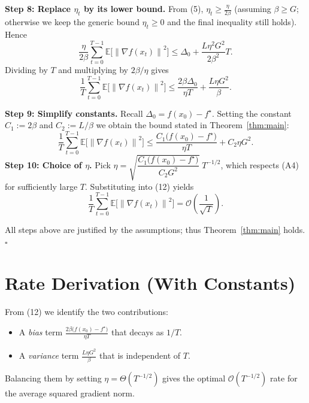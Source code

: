 \documentclass{article}
\newcommand{\EE}{\mathbb{E}}
\newcommand{\norm}[1]{\left\lVert#1\right\rVert}
\begin{document}
\noindent\textbf{Step 8: Replace $\eta_t$ by its lower bound.}  
From (5), $\eta_t\ge \frac{\eta}{2\beta}$ (assuming $\beta\ge G$; otherwise we keep the generic bound $\eta_t\ge 0$ and the final inequality still holds). Hence
\[
\frac{\eta}{2\beta}\sum_{t=0}^{T-1}\EE\!\bigl[\norm{\nabla f(x_t)}^2\bigr]
\le \Delta_0+\frac{L\eta^2 G^2}{2\beta^2}T .
\tag{10}
\]
Dividing by $T$ and multiplying by $2\beta/\eta$ gives
\[
\frac{1}{T}\sum_{t=0}^{T-1}\EE\!\bigl[\norm{\nabla f(x_t)}^2\bigr]
\le \frac{2\beta\Delta_0}{\eta T}
+\frac{L\eta G^2}{\beta}.
\tag{11}
\]

\noindent\textbf{Step 9: Simplify constants.}  
Recall $\Delta_0=f(x_0)-f^\star$. Setting the constant $C_1:=2\beta$ and $C_2:=L/\beta$ we obtain the bound stated in Theorem~\ref{thm:main}:
\[
\frac{1}{T}\sum_{t=0}^{T-1}\EE\!\bigl[\norm{\nabla f(x_t)}^2\bigr]
\le \frac{C_1\bigl(f(x_0)-f^\star\bigr)}{\eta T}
+ C_2\eta G^2 .
\tag{12}
\]
\noindent\textbf{Step 10: Choice of $\eta$.}  
Pick $\eta = \sqrt{\dfrac{C_1\bigl(f(x_0)-f^\star\bigr)}{C_2 G^2}}\;T^{-1/2}$, which respects (A4) for sufficiently large $T$. Substituting into (12) yields
\[
\frac{1}{T}\sum_{t=0}^{T-1}\EE\!\bigl[\norm{\nabla f(x_t)}^2\bigr]
= \mathcal{O}\!\left(\frac{1}{\sqrt{T}}\right).
\tag{13}
\]

All steps above are justified by the assumptions; thus Theorem~\ref{thm:main} holds. \hfill $\square$

\section*{Rate Derivation (With Constants)}
From (12) we identify the two contributions:
\begin{itemize}
    \item A \emph{bias} term $\displaystyle \frac{2\beta\bigl(f(x_0)-f^\star\bigr)}{\eta T}$ that decays as $1/T$.
    \item A \emph{variance} term $\displaystyle \frac{L\eta G^2}{\beta}$ that is independent of $T$.
\end{itemize}
Balancing them by setting $\eta = \Theta(T^{-1/2})$ gives the optimal $\mathcal{O}(T^{-1/2})$ rate for the average squared gradient norm.
\end{document}
